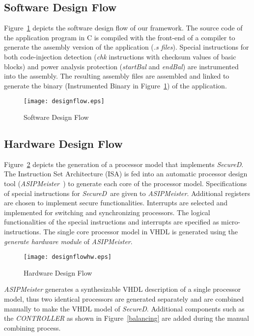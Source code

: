 \documentclass{article}
\newcommand{\SecureD}{\emph{SecureD}}
\begin{document}
\subsection{Software Design Flow} \label{designflowsw}
Figure~\ref{swdesignflow}     depicts the software design flow of our
framework. The  source  code  of  the   application   program in C is
compiled with the front-end of a compiler to generate   the  assembly
version of the application (\emph{.s files}). Special    instructions
for   both     code-injection detection (\emph{chk} instructions with 
checksum values of basic blocks) and power        analysis protection
(\emph{startBal} and \emph{endBal}) are instrumented into the assembly.
The resulting assembly files are assembled and     linked to generate
the binary (Instrumented Binary in Figure~\ref{swdesignflow}) of  the
application. 

\begin{figure}[th!]
\centering
\texttt{[image: designflow.eps]}
\caption{Software Design Flow}
\label{swdesignflow}
\end{figure}

\subsection{Hardware Design Flow} \label{designflowhw}
Figure~\ref{hwdesignflow}  depicts   the   generation  of a processor
model that implements \SecureD. The  Instruction   Set   Architecture
(ISA)  is  fed    into       an       automatic processor design tool 
(\emph{ASIPMeister~}\cite{ASIPMeister}) to  generate each core of the
processor model. Specifications of special instructions for \SecureD\ 
are given to \emph{ASIPMeister}. Additional registers are chosen   to 
implement  secure    functionalities. Interrupts are selected     and
implemented  for switching and synchronizing  processors. The logical 
functionalities   of      the special instructions and interrupts are
specified as micro-instructions. The single core  processor  model in
VHDL  is       generated using the \emph{generate hardware module} of
\emph{ASIPMeister}. 

\begin{figure}[th!]
\centering
\texttt{[image: designflowhw.eps]}
\caption{Hardware Design Flow}
\label{hwdesignflow}
\end{figure}

\emph{ASIPMeister} generates a synthesizable VHDL description  of   a
single processor model, thus two identical  processors are  generated
separately  and  are   combined    manually to make the VHDL model of
\SecureD. Additional   components   such as the \emph{CONTROLLER}  as
shown in Figure~\ref{balancing} are added during the manual combining
process.
\end{document}
